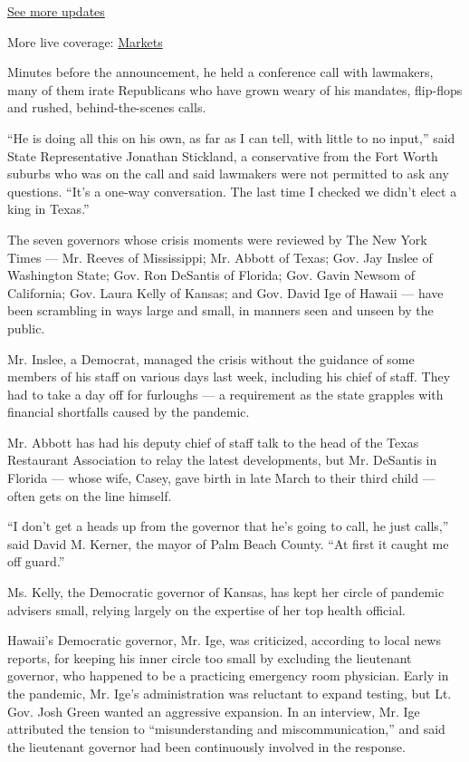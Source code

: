 \href{https://www.nytimes.com/2020/08/01/world/coronavirus-covid-19.html?action=click\&pgtype=Article\&state=default\&region=MAIN_CONTENT_1\&context=storylines_live_updates}{See
more updates}

More live coverage:
\href{https://www.nytimes.com/live/2020/07/31/business/stock-market-today-coronavirus?action=click\&pgtype=Article\&state=default\&region=MAIN_CONTENT_1\&context=storylines_live_updates}{Markets}

Minutes before the announcement, he held a conference call with
lawmakers, many of them irate Republicans who have grown weary of his
mandates, flip-flops and rushed, behind-the-scenes calls.

``He is doing all this on his own, as far as I can tell, with little to
no input,'' said State Representative Jonathan Stickland, a conservative
from the Fort Worth suburbs who was on the call and said lawmakers were
not permitted to ask any questions. ``It's a one-way conversation. The
last time I checked we didn't elect a king in Texas.''

The seven governors whose crisis moments were reviewed by The New York
Times --- Mr. Reeves of Mississippi; Mr. Abbott of Texas; Gov. Jay
Inslee of Washington State; Gov. Ron DeSantis of Florida; Gov. Gavin
Newsom of California; Gov. Laura Kelly of Kansas; and Gov. David Ige of
Hawaii --- have been scrambling in ways large and small, in manners seen
and unseen by the public.

Mr. Inslee, a Democrat, managed the crisis without the guidance of some
members of his staff on various days last week, including his chief of
staff. They had to take a day off for furloughs --- a requirement as the
state grapples with financial shortfalls caused by the pandemic.

Mr. Abbott has had his deputy chief of staff talk to the head of the
Texas Restaurant Association to relay the latest developments, but Mr.
DeSantis in Florida --- whose wife, Casey, gave birth in late March to
their third child --- often gets on the line himself.

``I don't get a heads up from the governor that he's going to call, he
just calls,'' said David M. Kerner, the mayor of Palm Beach County. ``At
first it caught me off guard.''

Ms. Kelly, the Democratic governor of Kansas, has kept her circle of
pandemic advisers small, relying largely on the expertise of her top
health official.

Hawaii's Democratic governor, Mr. Ige, was criticized, according to
local news reports, for keeping his inner circle too small by excluding
the lieutenant governor, who happened to be a practicing emergency room
physician. Early in the pandemic, Mr. Ige's administration was reluctant
to expand testing, but Lt. Gov. Josh Green wanted an aggressive
expansion. In an interview, Mr. Ige attributed the tension to
``misunderstanding and miscommunication,'' and said the lieutenant
governor had been continuously involved in the response.

